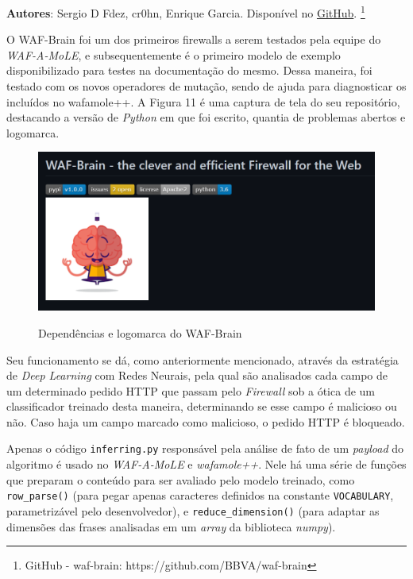 \textbf{Autores}: Sergio D Fdez, cr0hn, Enrique Garcia. Disponível no \href{https://github.com/BBVA/waf-brain}{GitHub}. \footnote{GitHub - waf-brain: https://github.com/BBVA/waf-brain}

O WAF-Brain \cite{waf_brain} foi um dos primeiros firewalls a serem testados pela equipe do \textit{WAF-A-MoLE}, e subsequentemente é o primeiro modelo de exemplo disponibilizado para testes na documentação do mesmo. Dessa maneira, foi testado com os novos operadores de mutação, sendo de ajuda para diagnosticar os incluídos no wafamole++. A Figura 11 é uma captura de tela do seu repositório, destacando a versão de \textit{Python} em que foi escrito, quantia de problemas abertos e logomarca.

\begin{figure}[ht]
    \centering
    \caption{Dependências e logomarca do WAF-Brain}
    \includegraphics[width=12.5cm]{figuras/WAFBrain.png} 
    \label{fig:internet} 
\end{figure}

Seu funcionamento se dá, como anteriormente mencionado, através da estratégia de \textit{Deep Learning} com Redes Neurais, pela qual são analisados cada campo de um determinado pedido HTTP que passam pelo \textit{Firewall} sob a ótica de um classificador treinado desta maneira, determinando se esse campo é malicioso ou não. Caso haja um campo marcado como malicioso, o pedido HTTP é bloqueado.

Apenas o código \verb+inferring.py+ responsável pela análise de fato de um \textit{payload} do algoritmo é usado no \textit{WAF-A-MoLE} e \textit{wafamole++}. Nele há uma série de funções que preparam o conteúdo para ser avaliado pelo modelo treinado, como \verb+row_parse()+ (para pegar apenas caracteres definidos na constante \verb+VOCABULARY+, parametrizável pelo desenvolvedor), e \verb+reduce_dimension()+ (para adaptar as dimensões das frases analisadas em um \textit{array} da biblioteca \textit{numpy}).

